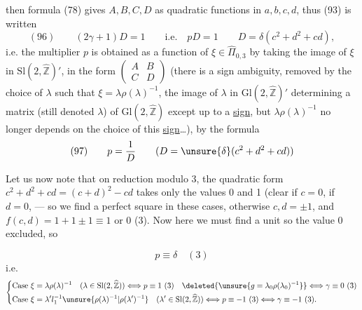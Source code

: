 then formula (78) gives $A,B,C,D$ as
quadratic functions in $a,b,c,d$, 
thus (93) is written
\[
(96)\qquad\boxed{(2\gamma+1)D=1\qquad\text{i.e.}\quad pD=1}
\qquad D=\delta(c^2+d^2+cd),
\]
i.e. the multiplier $p$ is obtained as a function
of $\xi\in\widehat\Pi_{0,3}$ by taking the image
of $\xi$ in $\mathrm{Sl}(2,\widehat{\mathbb Z})'$, in the form $\begin{pmatrix}A&B\\C&D\end{pmatrix}$
(there is a sign ambiguity, removed by the
choice of $\lambda$ such that $\xi=\lambda\rho(\lambda)^{-1}$, the image
of $\lambda$ in $\mathrm{Gl}(2,\widehat{\mathbb Z})'$  determining a
matrix (still denoted $\lambda$) of $\mathrm{Gl}(2,\widehat{\mathbb Z})$ except up to a
\uline{sign}, but $\lambda\rho(\lambda)^{-1}$ no longer depends on the
choice of this \uline{sign}\ldots), by the formula
\[
(97)\qquad p=\frac1D\qquad (D=\unsure{\delta}(c^2+d^2+cd))
\]

Let us now note that on reduction modulo 3,
the quadratic form $c^2+d^2+cd=(c+d)^2-cd$
takes only the values 0 and 1 (clear if $c=0$,
if $d=0$, 
--- so we
find a perfect square in these  cases, otherwise
$c,d=\pm1$, and $f(c,d)=1+1\pm1\equiv1$ or $0$  (3). Now here
we must find a unit so the value 0 excluded,
so



\[
p\equiv\delta\quad(3)
\]
i.e.
\[
\left\{\begin{aligned}
\text{Case }\xi&=\lambda\rho(\lambda)^{-1}\quad(\lambda\in\mathrm{Sl}(2,\widehat{\mathbb Z}))
\Longleftrightarrow p\equiv1\ (3)\quad\deleted{\unsure{g=\lambda_0\rho(\lambda_0)^{-1}}}\Longleftrightarrow\gamma\equiv0\ (3)\\
\text{Case }\xi&=\lambda'l_1^{-1}\unsure{\rho(\lambda)^{-1}|\rho(\lambda')^{-1}}\quad(\lambda'\in\mathrm{Sl}(2,\widehat{\mathbb Z}))
\Longleftrightarrow p\equiv-1\ (3)\Longleftrightarrow\gamma\equiv-1\ (3).
\end{aligned}\right.
\]

